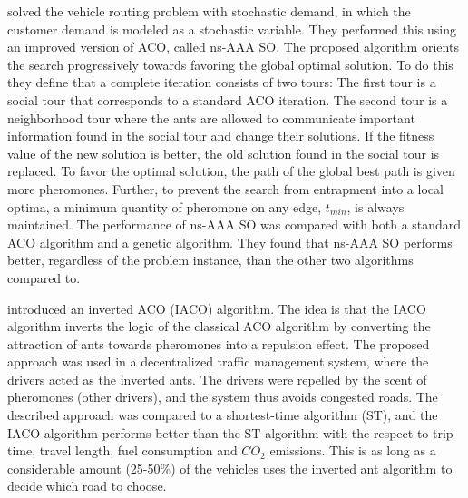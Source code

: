 \citet{tripathi09} solved the vehicle routing problem with stochastic demand, in which the customer demand is modeled as a stochastic variable. They performed this using an improved version of ACO, called ns-AAA SO. The proposed algorithm orients the search progressively towards favoring the global optimal solution. To do this they define that a complete iteration consists of two tours: The first tour is a social tour that corresponds to a standard ACO iteration. The second tour is a neighborhood tour where the ants are allowed to communicate important information found in the social tour and change their solutions. If the fitness value of the new solution is better, the old solution found in the social tour is replaced. To favor the optimal solution, the path of the global best path is given more pheromones. Further, to prevent the search from entrapment into a local optima, a minimum quantity of pheromone on any edge, $t_{min}$, is always maintained. The performance of ns-AAA SO was compared with both a standard ACO algorithm and a genetic algorithm. They found that ns-AAA SO performs better, regardless of the problem instance, than the other two algorithms compared to.

\citet{dias14} introduced an inverted ACO (IACO) algorithm. The idea is that the IACO algorithm inverts the logic of the classical ACO algorithm by converting the attraction of ants towards pheromones into a repulsion effect. The proposed approach was used in a decentralized traffic management system, where the drivers acted as the inverted ants. The drivers were repelled by the scent of pheromones (other drivers), and the system thus avoids congested roads. The described approach was compared to a shortest-time algorithm (ST), and the IACO algorithm performs better than the ST algorithm with the respect to trip time, travel length, fuel consumption and $CO_2$ emissions. This is as long as a considerable amount (25-50\%) of the vehicles uses the inverted ant algorithm to decide which road to choose. 


